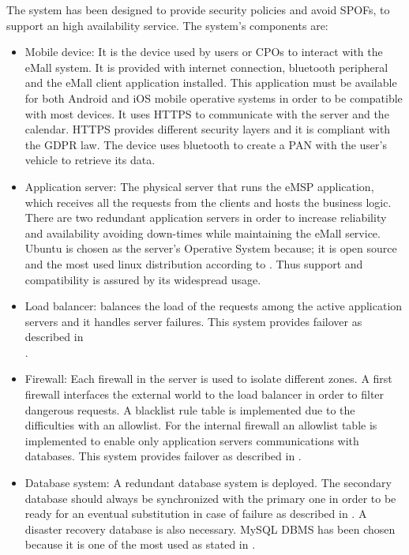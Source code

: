 The system has been designed to provide security policies and avoid \acp{SPOF}, to support an high availability service. The system's components are:
\begin{itemize}
    \item Mobile device: It is the device used by users or \acp{CPO} to interact with the \ac{eMall} system. It is provided with internet connection, bluetooth peripheral and the \ac{eMall} client application installed. This application must be available for both Android and iOS mobile operative systems in order to be compatible with most devices.
          It uses \ac{HTTPS} to communicate with the server and the calendar. \ac{HTTPS} provides different security layers and it is compliant with the \ac{GDPR} law. The device uses bluetooth to create a \ac{PAN} with the user's vehicle to retrieve its data.
    \item Application server: The physical server that runs the \ac{eMSP} application, which receives all the requests from the clients and hosts the business logic. There are two redundant application servers in order to increase reliability and availability avoiding down-times while maintaining the \ac{eMall} service.
          Ubuntu is chosen as the server's Operative System because; it is open source and the most used linux distribution according to \cite{ref:most-popular-linux-distro}. Thus support and compatibility is assured by its widespread usage.
    \item Load balancer: balances the load of the requests among the active application servers and it handles server failures. This system provides failover as described in \\\cite{ref:redundant-load-balancers}.
    \item Firewall: Each firewall in the server is used to isolate different zones. A first firewall interfaces the external world to the load balancer in order to filter dangerous requests.
          A blacklist rule table is implemented due to the difficulties with an allowlist. For the internal firewall an allowlist table is implemented to enable only application servers communications with databases. This system provides failover as described in \cite{ref:redundant-firewalls}.
    \item Database system: A redundant database system is deployed. The secondary database should always be synchronized with the primary one in order to be ready for an eventual substitution in case of failure as described in \cite{ref:redundant-databases}. A disaster recovery database is also necessary. MySQL \ac{DBMS} has been chosen because it is one of the most used as stated in \cite{ref:most-popular-RDBMS}.
\end{itemize}

